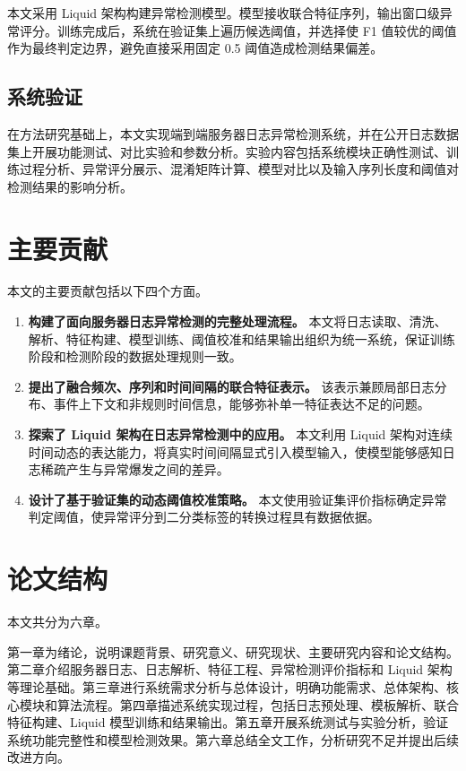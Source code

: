 本文采用 Liquid 架构构建异常检测模型。模型接收联合特征序列，输出窗口级异常评分。训练完成后，系统在验证集上遍历候选阈值，并选择使 F1 值较优的阈值作为最终判定边界，避免直接采用固定 0.5 阈值造成检测结果偏差。

\subsection{系统验证}

在方法研究基础上，本文实现端到端服务器日志异常检测系统，并在公开日志数据集上开展功能测试、对比实验和参数分析。实验内容包括系统模块正确性测试、训练过程分析、异常评分展示、混淆矩阵计算、模型对比以及输入序列长度和阈值对检测结果的影响分析。

\section{主要贡献}

本文的主要贡献包括以下四个方面。

\begin{enumerate}
    \item \textbf{构建了面向服务器日志异常检测的完整处理流程。} 本文将日志读取、清洗、解析、特征构建、模型训练、阈值校准和结果输出组织为统一系统，保证训练阶段和检测阶段的数据处理规则一致。
    
    \item \textbf{提出了融合频次、序列和时间间隔的联合特征表示。} 该表示兼顾局部日志分布、事件上下文和非规则时间信息，能够弥补单一特征表达不足的问题。
    
    \item \textbf{探索了 Liquid 架构在日志异常检测中的应用。} 本文利用 Liquid 架构对连续时间动态的表达能力，将真实时间间隔显式引入模型输入，使模型能够感知日志稀疏产生与异常爆发之间的差异。
    
    \item \textbf{设计了基于验证集的动态阈值校准策略。} 本文使用验证集评价指标确定异常判定阈值，使异常评分到二分类标签的转换过程具有数据依据。
\end{enumerate}

\section{论文结构}

本文共分为六章。

第一章为绪论，说明课题背景、研究意义、研究现状、主要研究内容和论文结构。第二章介绍服务器日志、日志解析、特征工程、异常检测评价指标和 Liquid 架构等理论基础。第三章进行系统需求分析与总体设计，明确功能需求、总体架构、核心模块和算法流程。第四章描述系统实现过程，包括日志预处理、模板解析、联合特征构建、Liquid 模型训练和结果输出。第五章开展系统测试与实验分析，验证系统功能完整性和模型检测效果。第六章总结全文工作，分析研究不足并提出后续改进方向。

